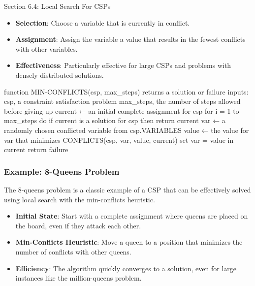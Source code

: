 \begin{notes}{Section 6.4: Local Search For CSPs}
    \begin{highlight}
    
        \begin{itemize}
            \item \textbf{Selection}: Choose a variable that is currently in conflict.
            \item \textbf{Assignment}: Assign the variable a value that results in the fewest conflicts with other variables.
            \item \textbf{Effectiveness}: Particularly effective for large CSPs and problems with densely distributed solutions.
        \end{itemize}

    \begin{code}[Pseudo]
    function MIN-CONFLICTS(csp, max_steps) returns a solution or failure
        inputs: csp, a constraint satisfaction problem
                max_steps, the number of steps allowed before giving up
        current ← an initial complete assignment for csp
        for i = 1 to max_steps do
            if current is a solution for csp then return current
            var ← a randomly chosen conflicted variable from csp.VARIABLES
            value ← the value for var that minimizes CONFLICTS(csp, var, value, current)
            set var = value in current
        return failure
    \end{code}

    \end{highlight}
    
    \subsubsection*{Example: 8-Queens Problem}
    
    The 8-queens problem is a classic example of a CSP that can be effectively solved using local search with the min-conflicts heuristic.
    
    \begin{highlight}
    
        \begin{itemize}
            \item \textbf{Initial State}: Start with a complete assignment where queens are placed on the board, even if they attack each other.
            \item \textbf{Min-Conflicts Heuristic}: Move a queen to a position that minimizes the number of conflicts with other queens.
            \item \textbf{Efficiency}: The algorithm quickly converges to a solution, even for large instances like the million-queens problem.
        \end{itemize}
    

\end{highlight}
\end{notes}

